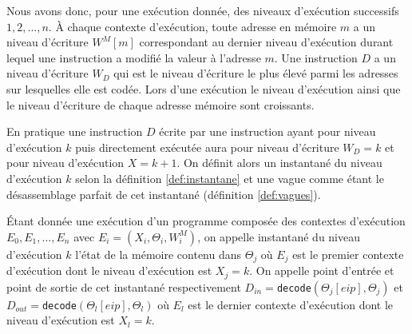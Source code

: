 Nous avons donc, pour une exécution donnée, des niveaux d'exécution successifs $1, 2, ..., n$.
À chaque contexte d'exécution, toute adresse en mémoire $m$ a un niveau d'écriture $W^M[m]$ correspondant au dernier niveau d'exécution durant lequel une instruction a modifié la valeur à l'adresse $m$.
Une instruction $D$ a un niveau d'écriture $W_D$ qui est le niveau d'écriture le plus élevé parmi les adresses sur lesquelles elle est codée.
Lors d'une exécution le niveau d'exécution ainsi que le niveau d'écriture de chaque adresse mémoire sont croissants.







En pratique une instruction $D$ écrite par une instruction ayant pour niveau d'exécution $k$ puis directement exécutée aura pour niveau d'écriture $W_D=k$ et pour niveau d'exécution $X=k+1$. On définit alors un instantané du niveau d'exécution $k$ selon la définition \ref{def:instantane} et une vague comme étant le désassemblage parfait de cet instantané (définition \ref{def:vagues}).

\begin{defi}
 Étant donnée une exécution d'un programme composée des contextes d'exécution $E_0, E_1, ..., E_n$ avec $E_i=(X_i, \Theta_i, W_i^M)$, on appelle instantané du niveau d'exécution $k$ l'état de la mémoire contenu dans $\Theta_j$ où $E_j$ est le premier contexte d'exécution dont le niveau d'exécution est $X_j=k$.
 On appelle point d'entrée et point de sortie de cet instantané respectivement $D_{in}=$\texttt{decode}$(\Theta_{j}[eip], \Theta_{j})$ et  $D_{out}=$\texttt{decode}$(\Theta_{l}[eip], \Theta_{l})$ où $E_l$ est le dernier contexte d'exécution dont le niveau d'exécution est $X_l=k$.
 \label{def:instantane}
\end{defi}

